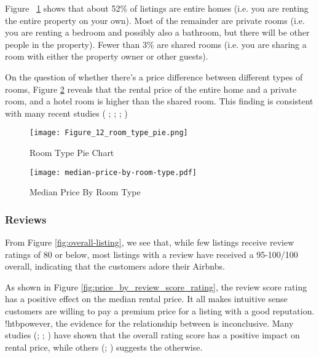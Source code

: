 Figure ~\ref{fig:room_type_pie} shows that about 52\% of listings are entire homes
(i.e. you are renting the entire property on your own). Most of the remainder
are private rooms (i.e. you are renting a bedroom and possibly also a bathroom,
but there will be other people in the property). Fewer than 3\% are shared rooms
(i.e. you are sharing a room with either the property owner or other guests).

On the question of whether there's a price difference between different types of
rooms, Figure \ref{fig:room_type_price} reveals that the rental price of the
entire home and a private room, and a hotel room is higher than the shared room.
This finding is consistent with many recent studies (\cite{cai2019price} ;
\cite{benitez2018flexible}; \cite{chen2017consumer}; \cite{gibbs2018use})

\begin{figure}[!htbp]
    \centering
        \centering
        \texttt{[image: Figure\_12\_room\_type\_pie.png]}
        \caption{Room Type Pie Chart}
        \label{fig:room_type_pie}
\end{figure}

\begin{figure}[!htbp]
        \centering
        \texttt{[image: median-price-by-room-type.pdf]}
        \caption{Median Price By Room Type}
        \label{fig:room_type_price}
\end{figure}

\subsubsection*{Reviews}

From Figure   \ref{fig:overall-listing}, we see that, while few listings receive
review ratings of 80 or below, most listings with a review have received a
95-100/100 overall,  indicating that the customers adore their Airbnbs.


As shown in Figure \ref{fig:price_by_review_score_rating}, the review score
rating has a positive effect on the median rental price. It all makes intuitive
sense customers are willing to pay a premium price for a listing with a good
reputation.  !htbpowever, the evidence for the relationship between is inconclusive.
Many studies (\cite{chen2017consumer}; \cite{gibbs2018use};
\cite{wang2017price}) have shown that the overall rating score has a positive
impact on rental price, while others (\cite{li2016pros}; \cite{zhang2017key})
suggests the otherwise.

